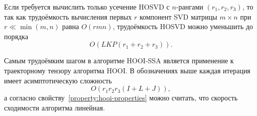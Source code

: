 \documentclass[specialist,
    substylefile = spbu.rtx,
    subf,href,colorlinks=true, 12pt]{disser}
\theoremstyle{plain}
\theoremstyle{definition}
\theoremstyle{remark}
\begin{document}
    Если требуется вычислить только усечение HOSVD с $n$-рангами $(r_1, r_2, r_3)$, то так как
    трудоёмкость вычисления первых $r$ компонент SVD матрицы $m\times n$ при \linebreak $r \ll \min(m, n)$ равна
    $O\left(rmn\right)$, трудоёмкость HOSVD можно уменьшить до порядка
    \begin{equation}
        \label{eq:hosvd-mssa-trim-complexity}
        O(LKP(r_1 + r_2 + r_3)).
    \end{equation}
    
    Самым трудоёмким шагом в алгоритме HOOI-SSA является применение к траекторному тензору алгоритма HOOI.
    В обозначениях выше каждая итерация имеет асимптотическую сложность
    \begin{equation}
        \label{eq:hooi-iter-complexity}
        O(r_1 r_2 r_3 (I + L + J)),
    \end{equation}
    а согласно свойству~\ref{property:hooi-properties} можно считать, что скорость сходимости алгоритма линейная.
\end{document}

